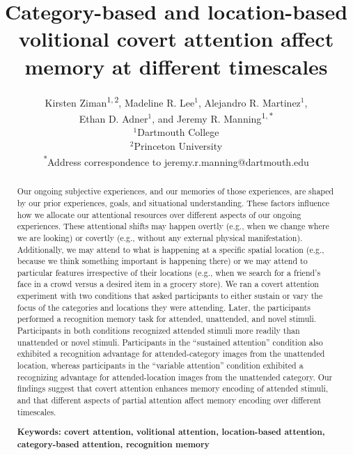 \documentclass[english]{article}
\begin{document}
\title{Category-based and location-based volitional covert attention affect
memory at different timescales}

\author{Kirsten Ziman\textsuperscript{$1, 2$},
Madeline R. Lee$^1$,
Alejandro R. Martinez$^1$,\\
Ethan D. Adner$^1$,
and
Jeremy R. Manning\textsuperscript{$1, *$}\\[0.1in]$^1$Dartmouth College\\
$^2$Princeton University\\
\textsuperscript{*}Address correspondence to jeremy.r.manning@dartmouth.edu}

\maketitle

\begin{abstract} 
  
Our ongoing subjective experiences, and our memories of those experiences, are
shaped by our prior experiences, goals, and situational understanding. These
factors influence how we allocate our attentional resources over different
aspects of our ongoing experiences. These attentional shifts may happen overtly
(e.g., when we change where we are looking) or covertly (e.g., without any
external physical manifestation). Additionally, we may attend to what is
happening at a specific spatial location (e.g., because we think something
important is happening there) or we may attend to particular features
irrespective of their locations (e.g., when we search for a friend's face in a
crowd versus a desired item in a grocery store). We ran a covert attention
experiment with two conditions that asked participants to either sustain or
vary the focus of the categories and locations they were attending. Later, the
participants performed a recognition memory task for attended, unattended, and
novel stimuli. Participants in both conditions recognized attended stimuli more
readily than unattended or novel stimuli. Participants in the ``sustained
attention'' condition also exhibited a recognition advantage for
attended-category images from the unattended location, whereas participants in
the ``variable attention'' condition exhibited a recognizing advantage for
attended-location images from the unattended category. Our findings suggest
that covert attention enhances memory encoding of attended stimuli, and that
different aspects of partial attention affect memory encoding over different
timescales.

\noindent\textbf{Keywords: covert attention, volitional attention,
location-based attention, category-based attention, recognition memory}

\end{abstract}
\end{document}
